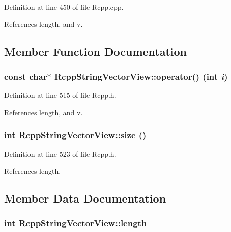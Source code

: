 Definition at line 450 of file Rcpp.cpp.

References length, and v.

\subsection{Member Function Documentation}
\hypertarget{classRcppStringVectorView_ab81899b7d6c595f84d2fb07809ff002c}{
\subsubsection[{operator()}]{\setlength{\rightskip}{0pt plus 5cm}const char$\ast$ RcppStringVectorView::operator() (int {\em i})}}
\label{classRcppStringVectorView_ab81899b7d6c595f84d2fb07809ff002c}


Definition at line 515 of file Rcpp.h.

References length, and v.\hypertarget{classRcppStringVectorView_adf0f6b6541339ca747c4ed79c445869e}{
\subsubsection[{size}]{\setlength{\rightskip}{0pt plus 5cm}int RcppStringVectorView::size ()}}
\label{classRcppStringVectorView_adf0f6b6541339ca747c4ed79c445869e}


Definition at line 523 of file Rcpp.h.

References length.

\subsection{Member Data Documentation}
\hypertarget{classRcppStringVectorView_aef6edaa52c234b4bb1fd1fc949fa0f25}{
\subsubsection[{length}]{\setlength{\rightskip}{0pt plus 5cm}int {\bf RcppStringVectorView::length}}}
\label{classRcppStringVectorView_aef6edaa52c234b4bb1fd1fc949fa0f25}



